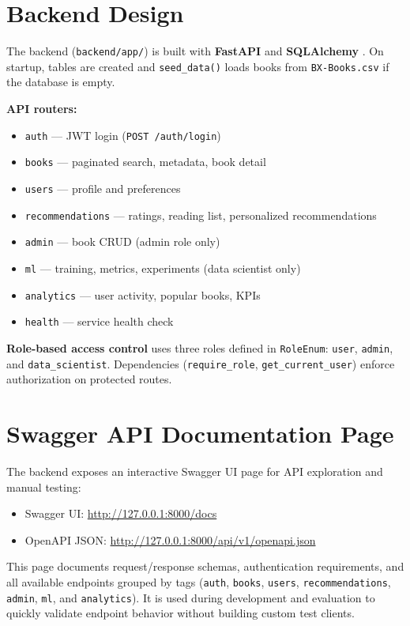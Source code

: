 \documentclass[12pt,a4paper]{report}
\begin{document}
\section{Backend Design}

The backend (\texttt{backend/app/}) is built with \textbf{FastAPI} and \textbf{SQLAlchemy} \cite{fastapi,sqlalchemy}. On startup, tables are created and \texttt{seed\_data()} loads books from \texttt{BX-Books.csv} if the database is empty.

\textbf{API routers:}
\begin{itemize}
    \item \texttt{auth} --- JWT login (\texttt{POST /auth/login})
    \item \texttt{books} --- paginated search, metadata, book detail
    \item \texttt{users} --- profile and preferences
    \item \texttt{recommendations} --- ratings, reading list, personalized recommendations
    \item \texttt{admin} --- book CRUD (admin role only)
    \item \texttt{ml} --- training, metrics, experiments (data scientist only)
    \item \texttt{analytics} --- user activity, popular books, KPIs
    \item \texttt{health} --- service health check
\end{itemize}

\textbf{Role-based access control} uses three roles defined in \texttt{RoleEnum}: \texttt{user}, \texttt{admin}, and \texttt{data\_scientist}. Dependencies (\texttt{require\_role}, \texttt{get\_current\_user}) enforce authorization on protected routes.

\section{Swagger API Documentation Page}

The backend exposes an interactive Swagger UI page for API exploration and manual testing:
\begin{itemize}
    \item Swagger UI: \url{http://127.0.0.1:8000/docs}
    \item OpenAPI JSON: \url{http://127.0.0.1:8000/api/v1/openapi.json}
\end{itemize}

This page documents request/response schemas, authentication requirements, and all available endpoints grouped by tags (\texttt{auth}, \texttt{books}, \texttt{users}, \texttt{recommendations}, \texttt{admin}, \texttt{ml}, and \texttt{analytics}). It is used during development and evaluation to quickly validate endpoint behavior without building custom test clients.
\end{document}
